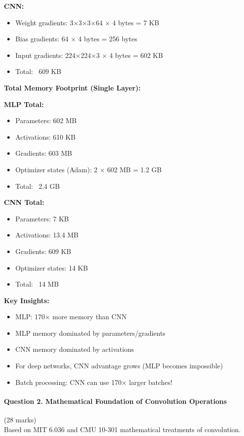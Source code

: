 \documentclass[12pt]{article}
\newcommand{\explanation}[1]{{\color{explanationcolor}#1}}
\begin{document}
\begin{enumerate}[(a)]
{{    \textbf{CNN:}
    \begin{itemize}
        \item Weight gradients: 3×3×3×64 × 4 bytes = 7 KB
        \item Bias gradients: 64 × 4 bytes = 256 bytes
        \item Input gradients: 224×224×3 × 4 bytes = 602 KB
        \item Total: ~609 KB
    \end{itemize}
    }
    
    \textbf{Total Memory Footprint (Single Layer):}
    
    \explanation{
    \textbf{MLP Total:}
    \begin{itemize}
        \item Parameters: 602 MB
        \item Activations: 610 KB
        \item Gradients: 603 MB
        \item Optimizer states (Adam): 2 × 602 MB = 1.2 GB
        \item Total: ~2.4 GB
    \end{itemize}
    
    \textbf{CNN Total:}
    \begin{itemize}
        \item Parameters: 7 KB
        \item Activations: 13.4 MB
        \item Gradients: 609 KB
        \item Optimizer states: 14 KB
        \item Total: ~14 MB
    \end{itemize}
    
    \textbf{Key Insights:}
    \begin{itemize}
        \item MLP: 170× more memory than CNN
        \item MLP memory dominated by parameters/gradients
        \item CNN memory dominated by activations
        \item For deep networks, CNN advantage grows (MLP becomes impossible)
        \item Batch processing: CNN can use 170× larger batches!
    \end{itemize}
    }
    }
\end{enumerate}

\newpage
\paragraph{Question 2. Mathematical Foundation of Convolution Operations}{{\hfill (28 marks)}}\\
Based on MIT 6.036 and CMU 10-301 mathematical treatments of convolution.
\end{document}
